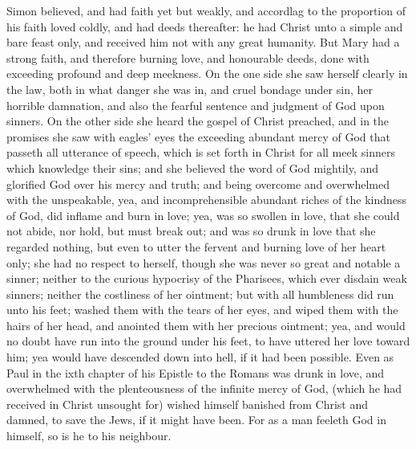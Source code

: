 Simon believed, and had faith yet but weakly, and
accordlag to the proportion of his faith loved coldly, and had deeds 
thereafter: he had Christ unto a simple and bare feast only, 
and received him not with any great humanity. But Mary 
had a strong faith, and therefore burning love, and
honourable deeds, done with exceeding profound and deep
meekness. On the one side she saw herself clearly in the law, 
both in what danger she was in, and cruel bondage
under sin, her horrible damnation, and also the fearful
sentence and judgment of God upon sinners. On the other
side she heard the gospel of Christ preached, and in the
promises she saw with eagles' eyes the exceeding abundant 
mercy of God that passeth all utterance of speech, which 
is set forth in Christ for all meek sinners which knowledge 
their sins; and she believed the word of God mightily, and 
glorified God over his mercy and truth; and being
overcome and overwhelmed with the unspeakable, yea, and
incomprehensible abundant riches of the kindness of God, 
did inflame and burn in love; yea, was so swollen in love, 
that she could not abide, nor hold, but must break out; and 
was so drunk in love that she regarded nothing, but even to 
utter the fervent and burning love of her heart only; she 
had no respect to herself, though she was never so great and 
notable a sinner; neither to the curious hypocrisy of the 
Pharisees, which ever disdain weak sinners; neither the 
costliness of her ointment; but with all humbleness did run
unto his feet; washed them with the tears of her eyes, and wiped 
them with the hairs of her head, and anointed them with 
her precious ointment; yea, and would no doubt have run 
into the ground under his feet, to have uttered her love
toward him; yea would have descended down into hell, if it 
had been possible. Even as Paul in the ixth chapter of 
his Epistle to the Romans was drunk in love, and overwhelmed
with the plenteousness of the infinite mercy of 
God, (which he had received in Christ unsought for) wished 
himself banished from Christ and damned, to save the Jews, 
if it might have been. For as a man feeleth God in himself, 
so is he to his neighbour. 

